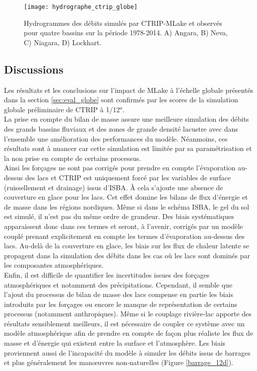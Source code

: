 \begin{figure}[h!]
\texttt{[image: hydrographe\_ctrip\_globe]}
\caption{Hydrogrammes des débits simulés par CTRIP-MLake et observés pour quatre bassins sur la période 1978-2014. A) Angara, B) Neva, C) Niagara, D) Lockhart.}
\label{cycle_globe}
\end{figure}

\clearpage
\subsection{{\selectfont Discussions}}

Les résultats et les conclusions sur l'impact de MLake à l'échelle globale présentés dans la section \ref{sec:eval_globe} sont confirmés par les scores de la simulation globale préliminaire de CTRIP à 1/12°.\\
La prise en compte du bilan de masse assure une meilleure simulation des débits des grands bassins fluviaux et des zones de grande densité lacustre avec dans l'ensemble une amélioration des performances du modèle. Néanmoins, ces résultats sont à nuancer car cette simulation est limitée par sa paramétrisation et la non prise en compte de certains processus. \\
Ainsi les forçages ne sont pas corrigés pour prendre en compte l'évaporation au-dessus des lacs et CTRIP est uniquement forcé par les variables de surface (ruissellement et drainage) issus d'ISBA. À cela s'ajoute une absence de couverture en glace pour les lacs. Cet effet domine les bilans de flux d'énergie et de masse dans les régions nordiques. Même si dans le schéma ISBA, le gel du sol est simulé, il n'est pas du même ordre de grandeur. Des biais systématiques apparaissent donc dans ces termes et seront, à l'avenir, corrigés par un modèle couplé prenant explicitement en compte les termes d'évaporation au-dessus des lacs. Au-delà de la couverture en glace, les biais sur les flux de chaleur latente se propagent dans la simulation des débits dans les cas où les lacs sont dominés par les composantes atmosphériques.\\
Enfin, il est difficile de quantifier les incertitudes issues des forçages atmosphériques et notamment des précipitations. Cependant, il semble que l'ajout du processus de bilan de masse des lacs compense en partie les biais introduits par les forçages ou encore le manque de représentation de certains processus (notamment anthropiques). Même si le couplage rivière-lac apporte des résultats sensiblement meilleurs, il est nécessaire de coupler ce système avec un modèle atmosphérique afin de prendre en compte de façon plus réaliste les flux de masse et d'énergie qui existent entre la surface et l'atmosphère. Les biais proviennent aussi de l'incapacité du modèle à simuler les débits issus de barrages et plus généralement les manœuvres non-naturelles (Figure \ref{barrage_12d}).\\

